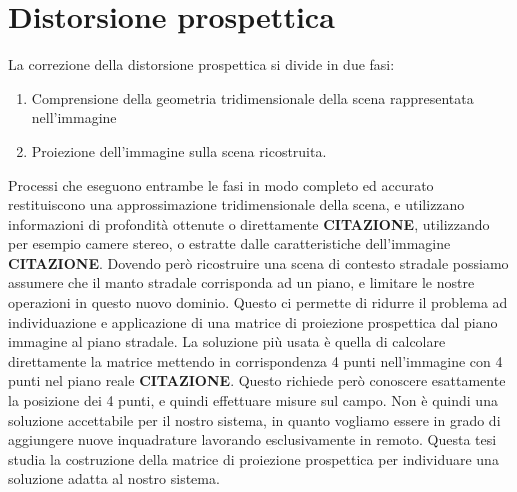 \section{Distorsione prospettica}
\label{sec:funzionalita-prospettiva}
La correzione della distorsione prospettica si divide in due fasi:
\begin{enumerate}
    \item Comprensione della geometria tridimensionale della scena rappresentata nell'immagine
    \item Proiezione dell'immagine sulla scena ricostruita.
\end{enumerate}
Processi che eseguono entrambe le fasi in modo completo ed accurato restituiscono una approssimazione tridimensionale della scena, e utilizzano informazioni di profondità ottenute o direttamente \textbf{CITAZIONE}, utilizzando per esempio camere stereo, o estratte dalle caratteristiche dell'immagine \textbf{CITAZIONE}.
Dovendo però ricostruire una scena di contesto stradale possiamo assumere che il manto stradale corrisponda ad un piano, e limitare le nostre operazioni in questo nuovo dominio.
Questo ci permette di ridurre il problema ad individuazione e applicazione di una matrice di proiezione prospettica dal piano immagine al piano stradale.
La soluzione più usata è quella di calcolare direttamente la matrice mettendo in corrispondenza 4 punti nell'immagine con 4 punti nel piano reale \textbf{CITAZIONE}.
Questo richiede però conoscere esattamente la posizione dei 4 punti, e quindi effettuare misure sul campo.
Non è quindi una soluzione accettabile per il nostro sistema, in quanto vogliamo essere in grado di aggiungere nuove inquadrature lavorando esclusivamente in remoto.
Questa tesi studia la costruzione della matrice di proiezione prospettica per individuare una soluzione adatta al nostro sistema.
